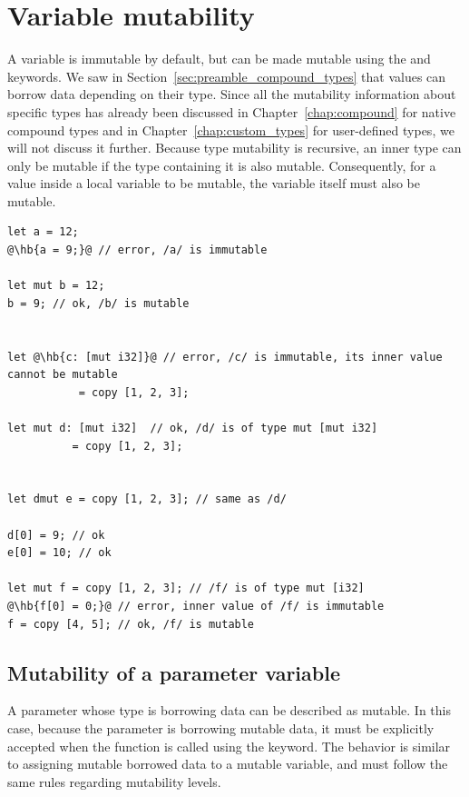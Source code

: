 \section{Variable mutability}
\label{sec:variable_mutability}

A variable is immutable by default, but can be made mutable using the
 and  keywords. We saw in
Section~\ref{sec:preamble_compound_types} that values can borrow data depending
on their type. Since all the mutability information about specific types has
already been discussed in Chapter~\ref{chap:compound} for native compound types
and in Chapter~\ref{chap:custom_types} for user-defined types, we will not
discuss it further. Because type mutability is recursive, an inner type can only
be mutable if the type containing it is also mutable. Consequently, for a value
inside a local variable to be mutable, the variable itself must also be mutable.

\begin{lstlisting}[style=coloredverbatimError, escapechar=@]
let a = 12;
@\hb{a = 9;}@ // error, /a/ is immutable

let mut b = 12;
b = 9; // ok, /b/ is mutable


let @\hb{c: [mut i32]}@ // error, /c/ is immutable, its inner value cannot be mutable
           = copy [1, 2, 3];

let mut d: [mut i32]  // ok, /d/ is of type mut [mut i32]
          = copy [1, 2, 3];


let dmut e = copy [1, 2, 3]; // same as /d/

d[0] = 9; // ok
e[0] = 10; // ok

let mut f = copy [1, 2, 3]; // /f/ is of type mut [i32]
@\hb{f[0] = 0;}@ // error, inner value of /f/ is immutable
f = copy [4, 5]; // ok, /f/ is mutable
\end{lstlisting}


\subsection{Mutability of a parameter variable}

A parameter whose type is borrowing data can be described as mutable. In this
case, because the parameter is borrowing mutable data, it must be explicitly
accepted when the function is called using the  keyword. The
behavior is similar to assigning mutable borrowed data to a mutable variable,
and must follow the same rules regarding mutability levels.

